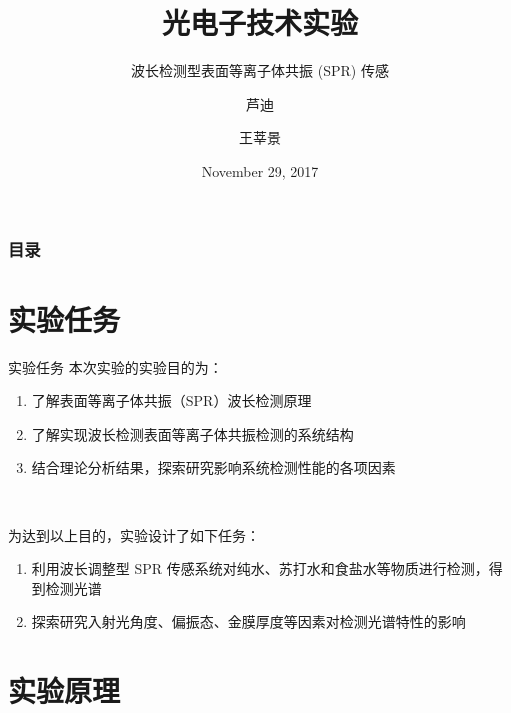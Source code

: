 \documentclass{beamer}
\title[光电报告] %
{光电子技术实验}
\subtitle{波长检测型表面等离子体共振 (SPR) 传感}
\author[芦, 王] %
{芦迪 \and 王莘景}
\institute[THU, EE] %
{
  Department of Electronic Engineering,\\
  Tsinghua University
}
\date[2017.11.29] %
{November 29, 2017}
\begin{document}
\frame{\titlepage}


\begin{frame}
\frametitle{目录}
\tableofcontents
\end{frame}


\section{实验任务}

\begin{frame}{实验任务}
  本次实验的实验目的为：
  \begin{enumerate}
    \item 了解表面等离子体共振（SPR）波长检测原理
    \item 了解实现波长检测表面等离子体共振检测的系统结构
    \item 结合理论分析结果，探索研究影响系统检测性能的各项因素
  \end{enumerate}
  \
  
  \pause
  为达到以上目的，实验设计了如下任务：
  \begin{enumerate}
      \item 利用波长调整型 SPR 传感系统对纯水、苏打水和食盐水等物质进行检测，得到检测光谱
      \item 探索研究入射光角度、偏振态、金膜厚度等因素对检测光谱特性的影响
  \end{enumerate}
\end{frame}






\section{实验原理}
\end{document}
